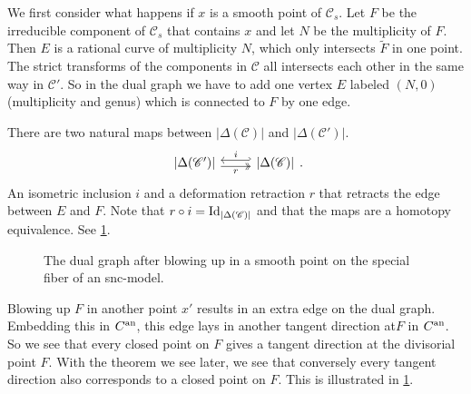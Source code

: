 We first consider what happens if $x $ is a smooth point of $\mathscr C_s$. 
Let $F$ be the irreducible component of $\mathscr C_s$ that contains $x$ and let $N$ be the multiplicity of $F$. 
Then $E$ is a rational curve of multiplicity $N$, which only intersects $\tilde F$ in one point. 
The strict transforms of the components in $\mathscr C$ all intersects each other in the same way in $\mathscr C'$. 
So in the dual graph we have to add one vertex $E$ labeled $(N, 0)$ (multiplicity and genus) which is connected to $F$ by one edge.

There are two natural maps between $|\Delta(\mathscr C)|$ and $|\Delta(\mathscr C')|$. 
\[
\begin{tikzcd}
	{|\Delta(\mathscr C')|} \rar[hookleftarrow, shift left]{i} \rar[twoheadrightarrow, shift right, ']{r} & {|\Delta(\mathscr C)|} 
\end{tikzcd}
.\] 
An isometric inclusion $i$ and a deformation retraction $r$ that retracts the edge between  $E$ and $F$. 
Note that $r \circ i = \operatorname{Id}_{|\Delta(\mathscr C)|}$ and that the maps are a homotopy equivalence. 
See \cref{fig:blowup_smooth_point_skeleton}. 

\begin{figure}[ht]
    \centering
    \caption{The dual graph after blowing up in a smooth point on the special fiber of an snc-model. }
    \label{fig:blowup_smooth_point_skeleton}
\end{figure}

\begin{remark}
	Blowing up $ F$ in another point $x'$ results in an extra edge on the dual graph. 
	Embedding this in $C{}^{\text{an}}$, this edge lays in another tangent direction at$F$ in $C{}^{\text{an}}$. 
	So we see that every closed point  on  $F$ gives a tangent direction at the divisorial point $F$. 
	With the theorem we see later, we see that conversely every tangent direction also corresponds to a closed point on $F$. 
	This is illustrated in \cref{fig:blowup_smooth_point_skeleton}.
\end{remark}


\medskip


